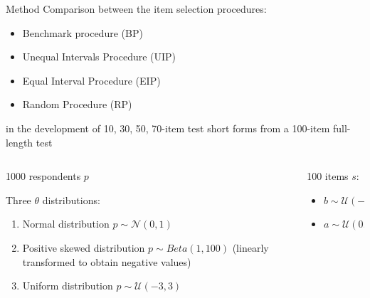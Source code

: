 \documentclass[final,t]{beamer}
\begin{document}
\begin{frame}
\begin{columns}[t]
			
			
			\begin{column}{.45\linewidth}
				
		\begin{block}{\centering Method}
			Comparison between the item selection procedures: 
			\begin{itemize}
				\item Benchmark procedure (BP)
				\item Unequal Intervals Procedure (UIP)
				\item Equal Interval Procedure (EIP)
				\item Random Procedure (RP)
			\end{itemize}
		in the development of 10, 30, 50, 70-item test short forms from a  100-item full-length test 
			\begin{columns}
				\begin{column}{.50\linewidth}
					\begin{center}
						1000 respondents $p$
					\end{center}
					Three $\theta$ distributions: 
					\begin{enumerate}
						\item Normal distribution $p \sim \mathcal{N}(0,1)$
						\item Positive skewed distribution $p \sim Beta(1, 100)$ (linearly transformed to obtain negative values)
						\item Uniform distribution $p \sim \mathcal{U}(-3,3)$
					\end{enumerate}
					
				\end{column}
				
				\begin{column}{.50\linewidth}
					\begin{center}
						100 items $s$:
					\end{center}
					\begin{itemize}
						\item $b \sim \mathcal{U}(-3,3)$
						\item  $a \sim \mathcal{U}(0.40,2)$
					\end{itemize}
				\end{column}
			\end{columns}
	
	\end{block}
				

\end{column}
\end{columns}
\end{frame}
\end{document}
